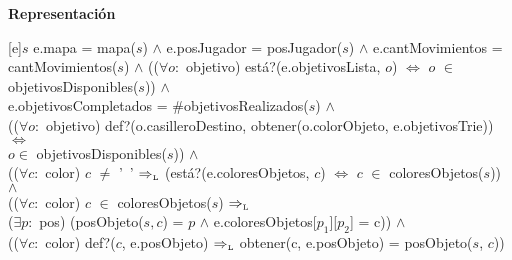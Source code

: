 \documentclass[a4paper,10pt]{article}
\newenvironment{Representacion}{%
  \vspace*{2ex}%
  \noindent\textbf{\Large Representación}%
  \vspace*{2ex}%
}{}
\begin{document}
\begin{Representacion}
  [e]{$s$}
  {e.mapa = mapa($s$) $\land$ e.posJugador = posJugador($s$) $\land$ e.cantMovimientos = cantMovimientos($s$) $\land$ 
  (($\forall o:$ objetivo)  está?(e.objetivosLista, $o$) $\iff$ $o$ $\in$ objetivosDisponibles($s$)) $\land$ \\
  e.objetivosCompletados = $\#$objetivosRealizados($s$) $\land$ \\
  (($\forall o:$ objetivo) def?(o.casilleroDestino, obtener(o.colorObjeto, e.objetivosTrie)) $\iff$ \\ $o \in$ objetivosDisponibles($s$)) $\land$ \\
  (($\forall c:$ color) $c$ $\neq$ '\ '  $\Rightarrow_{\mathrm{\scriptscriptstyle{L}}}$ (está?(e.coloresObjetos, $c$) $\iff$ $c$ $\in$ coloresObjetos($s$)) $\land$ \\ 
  (($\forall c:$ color) $c$ $\in$ coloresObjetos($s$) $\Rightarrow_{\mathrm{\scriptscriptstyle{L}}}$ \\
  ($\exists p:$ pos) (posObjeto($s, c$) = $p$ $\land$ e.coloresObjetos[$p_{1}$][$p_{2}$] = c)) $\land$ \\
  (($\forall c:$ color) def?($c$, e.posObjeto) $\Rightarrow_{\mathrm{\scriptscriptstyle{L}}}$ obtener(c, e.posObjeto) = posObjeto($s$, $c$))}

\end{Representacion}
\end{document}
